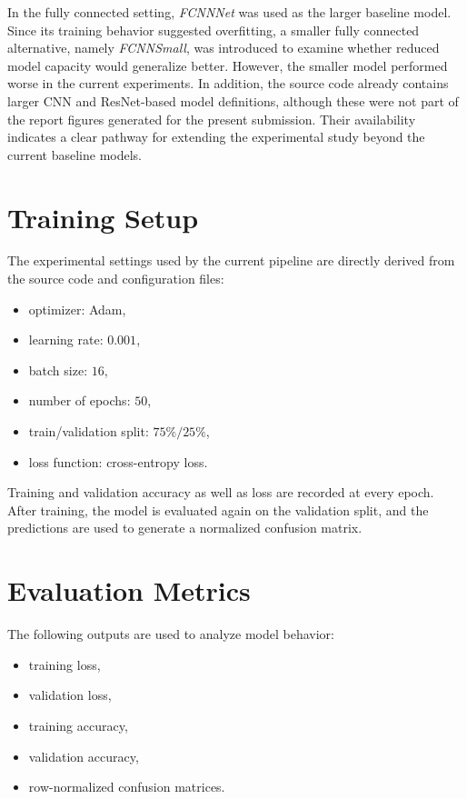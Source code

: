 \documentclass[12pt]{report}
\begin{document}
In the fully connected setting, \textit{FCNNNet} was used as the larger baseline model. Since its training behavior suggested overfitting, a smaller fully connected alternative, namely \textit{FCNNSmall}, was introduced to examine whether reduced model capacity would generalize better. However, the smaller model performed worse in the current experiments. In addition, the source code already contains larger CNN and ResNet-based model definitions, although these were not part of the report figures generated for the present submission. Their availability indicates a clear pathway for extending the experimental study beyond the current baseline models.

\section{Training Setup}

The experimental settings used by the current pipeline are directly derived from the source code and configuration files:

\begin{itemize}
    \item optimizer: Adam,
    \item learning rate: \(0.001\),
    \item batch size: \(16\),
    \item number of epochs: \(50\),
    \item train/validation split: \(75\% / 25\%\),
    \item loss function: cross-entropy loss.
\end{itemize}

Training and validation accuracy as well as loss are recorded at every epoch. After training, the model is evaluated again on the validation split, and the predictions are used to generate a normalized confusion matrix.

\section{Evaluation Metrics}

The following outputs are used to analyze model behavior:

\begin{itemize}
    \item training loss,
    \item validation loss,
    \item training accuracy,
    \item validation accuracy,
    \item row-normalized confusion matrices.
\end{itemize}
\end{document}
